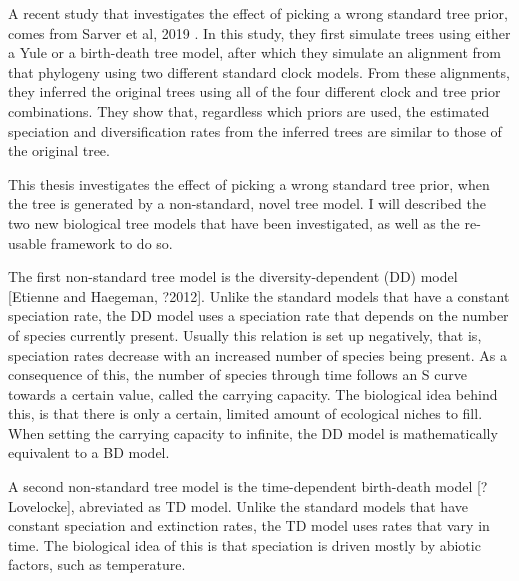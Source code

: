 A recent study that investigates the effect of picking
a wrong standard tree prior, comes from Sarver et al, 2019 \cite{sarver2019choice}.
In this study, they first simulate trees using either a Yule or a birth-death
tree model, after which they simulate an alignment from that phylogeny
using two different standard clock models. From these alignments, 
they inferred the original trees using all of the four 
different clock and tree prior combinations. 
They show that, regardless which priors are used,
the estimated speciation and diversification rates 
from the inferred trees are similar to those of the original tree.

This thesis investigates the effect of picking a wrong standard
tree prior, when the tree is generated by a non-standard, novel tree model.
I will described the two new biological tree models that have been
investigated, as well as the re-usable framework to do so. 

The first non-standard tree model is the diversity-dependent (DD) 
model [Etienne and Haegeman, ?2012].
Unlike the standard models that have a constant speciation rate,
the DD model uses a speciation rate that depends on the number
of species currently present. Usually this relation is set up negatively,
that is, speciation rates decrease with an increased number of species being
present. As a consequence of this, the number of species through time
follows an S curve towards a certain value, called the carrying capacity.
The biological idea behind this, is that there is only a certain,
limited amount of ecological niches to fill. When setting the carrying 
capacity to infinite, the DD model is mathematically equivalent to a
BD model.



%
%
%
%
%

A second non-standard tree model is the time-dependent birth-death model [?Lovelocke],
abreviated as TD model.
Unlike the standard models that have constant speciation and extinction rates,
the TD model uses rates that vary in time. 
The biological idea of this is that speciation is driven mostly 
by abiotic factors, such as temperature.


